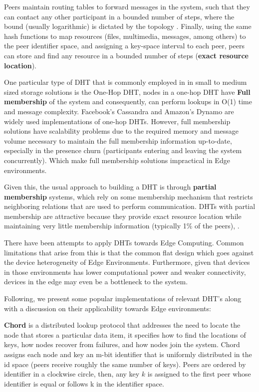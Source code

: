 Peers maintain routing tables to forward messages in the system, such that they can contact any other participant in a bounded number of steps, where the bound (usually logarithmic) is dictated by the topology . Finally, using the same hash functions to map resources (files, multimedia, messages, among others) to the peer identifier space, and assigning a key-space interval to each peer, peers can store and find any resource in a bounded number of steps (\textbf{exact resource location}).

One particular type of DHT that is commonly employed in in small to medium sized storage solutions is the One-Hop DHT, nodes in a one-hop DHT have \textbf{Full membership} of the system and consequently, can perform lookups in O(1) time and message complexity. Facebook's Cassandra \cite{lakshman2010cassandra} and Amazon's Dynamo \cite{decandia2007dynamo} are widely used implementations of one-hop DHTs. However, full membership solutions have scalability problems due to the required memory and message volume necessary to maintain the full membership information up-to-date, especially in the presence churn (participants entering and leaving the system concurrently). Which make full membership solutions impractical in Edge environments.

Given this, the usual approach to building a DHT is through \textbf{partial membership} systems, which rely on some membership mechanism that restricts neighboring relations that are used to perform communication. DHTs with partial membership are attractive because they provide exact resource location while maintaining very little membership information (typically 1\% of the peers), . 

There have been attempts to apply DHTs towards Edge Computing. Common limitations that arise from this is that the common flat design which goes against the device heterogeneity of Edge Environments. Furthermore, given that devices in those environments has lower computational power and weaker connectivity, devices in the edge may even be a bottleneck to the system. 

Following, we present some popular implementations of relevant DHT's along with a discussion on their applicability towards Edge environments:

\textbf{Chord} \cite{stoica2003chord} is a distributed lookup protocol that addresses the need to locate the node that stores a particular data item, it specifies how to find the locations of keys, how nodes recover from failures, and how nodes join the system. Chord assigns each node and key an m-bit identifier that is uniformly distributed in the id space (peers receive roughly the same number of keys). Peers are ordered by identifier in a clockwise circle, then, any key \(k\) is assigned to the first peer whose identifier is equal or follows k in the identifier space. 

